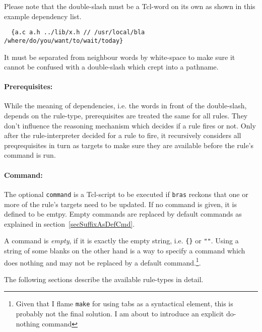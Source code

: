 \documentclass[12pt]{article}
\newcommand{\bras}{\texttt{bras}}
\newcommand{\make}{\texttt{make}}
\begin{document}
Please note that the double-slash must be a Tcl-word on its own as
shown in this example dependency list.
\begin{verbatim}
  {a.c a.h ../lib/x.h // /usr/local/bla /where/do/you/want/to/wait/today}
\end{verbatim}
It must be separated from neighbour words by white-space to make sure
it cannot be confused with a double-slash which crept into a pathname.


\paragraph{Prerequisites:}
While the meaning of dependencies, i.e. the words in front of the
double-slash, depends on the rule-type, prerequisites are treated the
same for all rules. They don't influence the reasoning mechanism which
decides if a rule fires or not. Only after the rule-interpreter
decided for a rule to fire, it recursively considers all
preqrequisites in turn as targets to make sure they are available
before the rule's command is run.

\paragraph{Command:}
The optional \texttt{command} is a Tcl-script to be executed if
\bras{} reckons that one or more of the rule's targets need to be
updated. If no command is given, it is defined to be emtpy. Empty
commands are replaced by default commands as explained in
section~\ref{secSuffixAsDefCmd}. 

A command is \textit{empty}, if it is exactly the empty string,
i.e. \verb+{}+ or \verb+""+. Using a string of some blanks on the
other hand is a way to specify a command which does nothing and may
not be replaced by a default command.\footnote{Given that I flame
\make{} for using tabs as a syntactical element, this is probably not
the final solution. I am about to introduce an explicit do-nothing
command}.

The following sections describe the available rule-types in detail.

\end{document}
